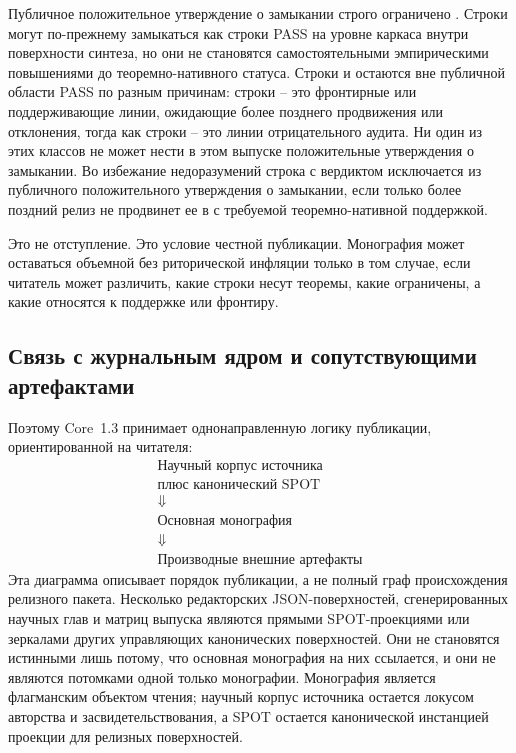 Публичное положительное утверждение о замыкании строго ограничено
. Строки  могут по-прежнему
замыкаться как строки PASS на уровне каркаса внутри поверхности синтеза, но
они не становятся самостоятельными эмпирическими повышениями до
теоремно-нативного статуса. Строки  и 
остаются вне публичной области PASS по разным причинам: строки
 -- это фронтирные или поддерживающие линии, ожидающие
более позднего продвижения или отклонения, тогда как строки 
-- это линии отрицательного аудита. Ни один из этих классов не может нести в
этом выпуске положительные утверждения о замыкании.
Во избежание недоразумений строка  с вердиктом
 исключается из публичного положительного утверждения о
замыкании, если только более поздний релиз не продвинет ее в
 с требуемой теоремно-нативной поддержкой.

Это не отступление. Это условие честной публикации. Монография может оставаться
объемной без риторической инфляции только в том случае, если читатель может
различить, какие строки несут теоремы, какие ограничены, а какие относятся к
поддержке или фронтиру.

\subsection{Связь с журнальным ядром и сопутствующими артефактами}

Поэтому Core~1.3 принимает однонаправленную логику публикации, ориентированной
на читателя:
\[
\begin{gathered}
\text{Научный корпус источника}\\
\text{плюс канонический SPOT}\\
\Downarrow\\
\text{Основная монография}\\
\Downarrow\\
\text{Производные внешние артефакты}
\end{gathered}
\]
Эта диаграмма описывает порядок публикации, а не полный граф происхождения
релизного пакета. Несколько редакторских JSON-поверхностей, сгенерированных
научных глав и матриц выпуска являются прямыми SPOT-проекциями или зеркалами
других управляющих канонических поверхностей. Они не становятся истинными лишь
потому, что основная монография на них ссылается, и они не являются потомками
одной только монографии. Монография является флагманским объектом чтения;
научный корпус источника остается локусом авторства и засвидетельствования, а
SPOT остается канонической инстанцией проекции для релизных поверхностей.

